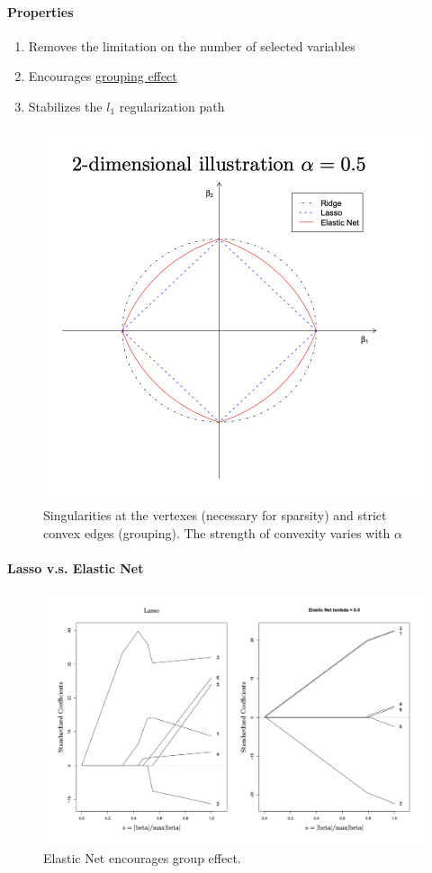 \documentclass[11pt]{article}
\newcommand{\under}[1]{\underline{#1}}
\begin{document}
 \paragraph{Properties}
 \begin{enumerate}
 	\item Removes the limitation on the number of selected variables
 	\item Encourages \under{grouping effect}
 	\item Stabilizes the $l_1$ regularization path
 \end{enumerate}
\begin{figure}[h]
	\centering
	\includegraphics[scale=0.6]{elastic.png}
	\caption{Singularities at the vertexes (necessary for sparsity) and strict convex edges (grouping). The strength of convexity varies with $\alpha$}
\end{figure}
\paragraph{Lasso v.s. Elastic Net}

 \begin{figure}[h]
	\centering
	\includegraphics[scale=0.6]{vs2.png}
	\caption{Elastic Net encourages group effect.}
\end{figure}
 
 
 
 
\end{document}
